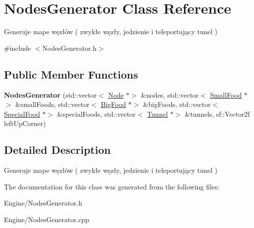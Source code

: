 \hypertarget{classNodesGenerator}{}\section{Nodes\+Generator Class Reference}
\label{classNodesGenerator}


Generuje mape węzłów ( zwykłe węzły, jedzienie i teleportujący tunel )  




{\ttfamily \#include $<$Nodes\+Generator.\+h$>$}

\subsection*{Public Member Functions}
\begin{DoxyCompactItemize}
\item 
\mbox{\label{classNodesGenerator_a8a67eb353d2df91f87ebac5394e799dd}} 
{\bfseries Nodes\+Generator} (std\+::vector$<$ \hyperlink{classNode}{Node} $\ast$$>$ \&nodes, std\+::vector$<$ \hyperlink{classSmallFood}{Small\+Food} $\ast$$>$ \&small\+Foods, std\+::vector$<$ \hyperlink{classBigFood}{Big\+Food} $\ast$$>$ \&big\+Foods, std\+::vector$<$ \hyperlink{classSpecialFood}{Special\+Food} $\ast$$>$ \&special\+Foods, std\+::vector$<$ \hyperlink{classTunnel}{Tunnel} $\ast$$>$ \&tunnels, sf\+::\+Vector2f left\+Up\+Corner)
\end{DoxyCompactItemize}


\subsection{Detailed Description}
Generuje mape węzłów ( zwykłe węzły, jedzienie i teleportujący tunel ) 

The documentation for this class was generated from the following files\+:\begin{DoxyCompactItemize}
\item 
Engine/Nodes\+Generator.\+h\item 
Engine/Nodes\+Generator.\+cpp\end{DoxyCompactItemize}
